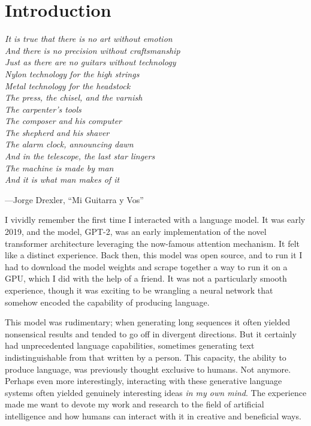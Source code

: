\chapter[Introduction]{Introduction}


\begin{flushleft}
\begin{minipage}[t]{0.80\textwidth}
\textit{It is true that there is no art without emotion\\
And there is no precision without craftsmanship\\
Just as there are no guitars without technology\\
Nylon technology for the high strings\\
Metal technology for the headstock\\
The press, the chisel, and the varnish\\
The carpenter's tools\\
The composer and his computer\\
The shepherd and his shaver\\
The alarm clock, announcing dawn\\
And in the telescope, the last star lingers\\
The machine is made by man\\
And it is what man makes of it}
\end{minipage}

\medskip
\hfill---Jorge Drexler, ``Mi Guitarra y Vos''
\end{flushleft}

\bigskip

I vividly remember the first time I interacted with a language model. It was early 2019, and the model, GPT-2, was an early implementation of the novel transformer architecture leveraging the now-famous attention mechanism. It felt like a distinct experience. Back then, this model was open source, and to run it I had to download the model weights and scrape together a way to run it on a GPU, which I did with the help of a friend. It was not a particularly smooth experience, though it was exciting to be wrangling a neural network that somehow encoded the capability of producing language.

This model was rudimentary; when generating long sequences it often yielded nonsensical results and tended to go off in divergent directions. But it certainly had unprecedented language capabilities, sometimes generating text indistinguishable from that written by a person. This capacity, the ability to produce language, was previously thought exclusive to humans. Not anymore. Perhaps even more interestingly, interacting with these generative language systems often yielded genuinely interesting ideas \textit{in my own mind}.  The experience made me want to devote my work and research to the field of artificial intelligence and how humans can interact with it in creative and beneficial ways.

